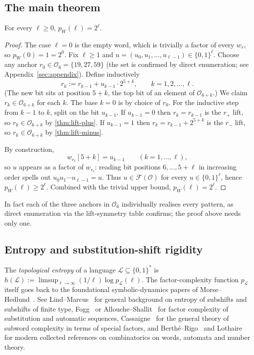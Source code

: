 \documentclass[11pt,reqno]{amsart}
\newcommand{\Obs}{\mathcal{O}}
\newcommand{\Fac}{\mathcal{F}}
\begin{document}
\subsection{The main theorem}

\begin{theorem*}
For every $\ell \ge 0$, $p_W(\ell) = 2^\ell$.
\end{theorem*}

\begin{proof}
The case $\ell = 0$ is the empty word, which is trivially a factor of every
$w_r$, so $p_W(0) = 1 = 2^0$. Fix $\ell \ge 1$ and
$u = (u_0, u_1, \ldots, u_{\ell-1}) \in \{0,1\}^\ell$. Choose any anchor
$r_0 \in \Obs_6 = \{19, 27, 59\}$ (the set is confirmed by direct
enumeration; see Appendix~\ref{sec:appendix}). Define inductively
\[
r_k := r_{k-1} + u_{k-1} \cdot 2^{5 + k}, \qquad k = 1, 2, \ldots, \ell.
\]
(The new bit sits at position $5+k$, the top bit of an element of $\Obs_{6+k}$.)
We claim $r_k \in \Obs_{6+k}$ for each $k$. The base $k = 0$ is by choice of
$r_0$. For the inductive step from $k-1$ to $k$, split on the bit $u_{k-1}$.
If $u_{k-1} = 0$ then $r_k = r_{k-1}$ is the $r_+$ lift, so
$r_k \in \Obs_{6+k}$ by \cref{thm:lift-plus}. If $u_{k-1} = 1$ then
$r_k = r_{k-1} + 2^{5+k}$ is the $r_-$ lift, so $r_k \in \Obs_{6+k}$ by
\cref{thm:lift-minus}.

By construction,
\[
w_{r_\ell}[5+k] = u_{k-1} \qquad (k = 1, \ldots, \ell),
\]
so $u$ appears as a factor of $w_{r_\ell}$: reading bit positions
$6, \ldots, 5+\ell$ in increasing order spells out
$u_0 u_1 \cdots u_{\ell-1} = u$. Thus
$u \in \Fac(\Obs)$ for every $u \in \{0,1\}^\ell$, hence $p_W(\ell) \ge 2^\ell$.
Combined with the trivial upper bound, $p_W(\ell) = 2^\ell$. \qedhere
\end{proof}

In fact each of the three anchors in $\Obs_6$ individually realises every
pattern, as direct enumeration via the lift-symmetry table confirms; the
proof above needs only one.

\subsection{Entropy and substitution-shift rigidity}

The \emph{topological entropy} of a language $\mathcal{L} \subseteq \{0,1\}^*$
is $h(\mathcal{L}) := \limsup_{\ell \to \infty} (1/\ell) \log p_{\mathcal{L}}(\ell)$.
The factor-complexity function $p_{\mathcal{L}}$ itself goes back to the
foundational symbolic-dynamics papers of
Morse--Hedlund~\cite{MorseHedlund1938,MorseHedlund1940}. See
Lind--Marcus~\cite{LindMarcus1995} for general background on entropy of
subshifts and subshifts of finite type, Fogg~\cite{Fogg2002} or
Allouche--Shallit~\cite{AlloucheShallit2003} for factor complexity of
substitution and automatic sequences,
Cassaigne~\cite{Cassaigne1997} for the general theory of subword
complexity in terms of special factors, and
Berth\'e--Rigo~\cite{BertheRigo2010} and Lothaire~\cite{Lothaire2002}
for modern collected references on combinatorics on words, automata
and number theory.
\end{document}
